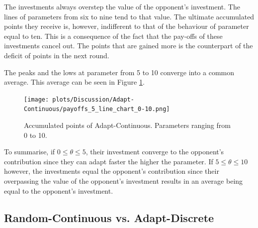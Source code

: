 \documentclass[11pt]{article}
\begin{document}
	The investments always overstep the value of the opponent's investment.
	The lines of parameters from six to nine tend to that value.
	The ultimate accumulated points they receive is, however, indifferent to that of the behaviour of parameter equal to ten.
	This is a consequence of the fact that the pay-offs of these investments cancel out.
	The points that are gained more is the counterpart of the deficit of points in the next round.
	
	The peaks and the lows at parameter from 5 to 10 converge into a common average.
	This average can be seen in Figure \ref{fig:AdpC_avr_points}.\\
	\begin{figure}[h]
		\begin{center}
			\texttt{[image: plots/Discussion/Adapt-Continuous/payoffs\_5\_line\_chart\_0-10.png]}
		\end{center}
		\caption{Accumulated points of Adapt-Continuous. Parameters ranging from 0 to 10.}
		\label{fig:AdpC_avr_points}
	\end{figure}
	
	To summarise, if $0 \le \theta \le 5$, their investment converge to the opponent's contribution since they can adapt faster the higher the parameter.
	If $5 \le \theta \le 10$ however, the investments equal the opponent's contribution since their overpassing the value of the opponent's investment results in an average being equal to the opponent's investment.\\
\subsection{Random-Continuous vs. Adapt-Discrete}
\end{document}
